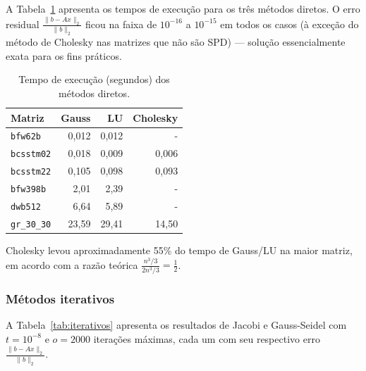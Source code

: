 \documentclass[12pt, a4paper]{article}
\begin{document}
A Tabela~\ref{tab:diretos} apresenta os tempos de execução para os três métodos diretos.
O erro residual $\frac{\|b - Ax\|_2}{\|b\|_2}$ ficou na faixa de $10^{-16}$ a $10^{-15}$ em todos os
casos (à exceção do método de Cholesky nas matrizes que não são SPD) — solução essencialmente exata para os fins práticos.
 
\begin{table}[H]
  \centering
  \caption{Tempo de execução (segundos) dos métodos diretos.}
  \label{tab:diretos}
  \renewcommand{\arraystretch}{1.3}
  \begin{tabular}{lrrr}
    \toprule
    \textbf{Matriz} & \textbf{Gauss} & \textbf{LU} & \textbf{Cholesky} \\
    \midrule
    \texttt{bfw62b}  & 0{,}012 & 0{,}012 & - \\
    \texttt{bcsstm02}  & 0{,}018 & 0{,}009 & 0{,}006 \\
    \texttt{bcsstm22}  & 0{,}105  & 0{,}098  & 0{,}093  \\
    \texttt{bfw398b}      & 2{,}01  & 2{,}39 & -  \\
    \texttt{dwb512} & 6{,}64 & 5{,}89 & - \\
    \texttt{gr\_30\_30} & 23{,}59 & 29{,}41 & 14{,}50 \\
    \bottomrule
  \end{tabular}
\end{table}
 
Cholesky levou aproximadamente 55\% do tempo de Gauss/LU na maior matriz, em acordo
com a razão teórica $\frac{n^3/3}{2n^3/3} = \frac{1}{2}$.
 
\subsubsection{Métodos iterativos}
 
A Tabela~\ref{tab:iterativos} apresenta os resultados de Jacobi e Gauss-Seidel com
$t = 10^{-8}$ e $o = 2000$ iterações máximas, cada um com seu respectivo erro
$\frac{\|b - Ax\|_2}{\|b\|_2}$.
 
\end{document}
